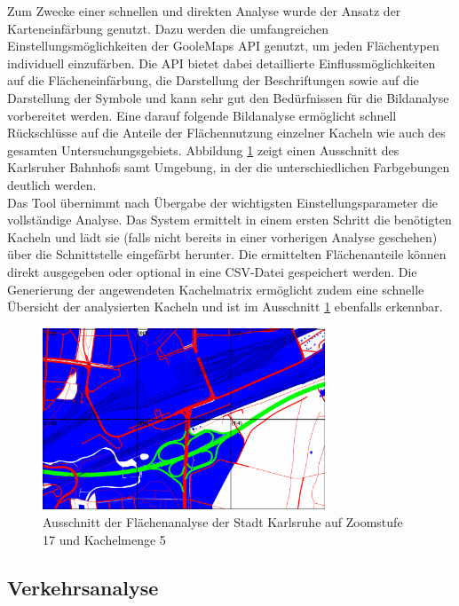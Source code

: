 Zum Zwecke einer schnellen und direkten Analyse wurde der Ansatz der Karteneinfärbung genutzt. Dazu werden die umfangreichen Einstellungsmöglichkeiten der GooleMaps API genutzt, um jeden Flächentypen individuell einzufärben. Die API bietet dabei detaillierte Einflussmöglichkeiten auf die Flächeneinfärbung, die Darstellung der Beschriftungen sowie auf die Darstellung der Symbole und kann sehr gut den Bedürfnissen für die Bildanalyse vorbereitet werden. Eine darauf folgende Bildanalyse ermöglicht schnell Rückschlüsse auf die Anteile der Flächennutzung einzelner Kacheln wie auch des gesamten Untersuchungsgebiets. Abbildung \ref{fig:ka_area_analysis} zeigt einen Ausschnitt des Karlsruher Bahnhofs samt Umgebung, in der die unterschiedlichen Farbgebungen deutlich werden.\\

Das Tool übernimmt nach Übergabe der wichtigsten Einstellungsparameter die vollständige Analyse. Das System ermittelt in einem ersten Schritt die benötigten Kacheln und lädt sie (falls nicht bereits in einer vorherigen Analyse geschehen) über die Schnittstelle eingefärbt herunter. Die ermittelten Flächenanteile können direkt ausgegeben oder optional in eine CSV-Datei gespeichert werden. Die Generierung der angewendeten Kachelmatrix ermöglicht zudem eine schnelle Übersicht der analysierten Kacheln und ist im Ausschnitt \ref{fig:ka_area_analysis} ebenfalls erkennbar.

\begin{figure}
  \centering
    \includegraphics[width=0.75\textwidth]{images/karlsruhe_area_analysis_ausschnitt.png}
    \caption{Ausschnitt der Flächenanalyse der Stadt Karlsruhe auf Zoomstufe 17 und Kachelmenge 5}
    \label{fig:ka_area_analysis}
\end{figure}

\subsection{Verkehrsanalyse}
\label{sec:traffic-analysis}

